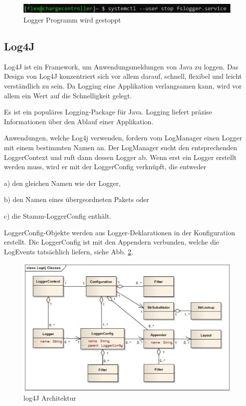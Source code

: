 \begin{figure}[h t]
    \centering
    \includegraphics[scale=0.75]{pics/loggerEnd2.JPG}
    \caption{Logger Programm wird gestoppt}
    \label{fig:impl:loggerEnd}
\end{figure}

\subsection{Log4J}
Log4J ist ein Framework, um Anwendungsmeldungen von Java zu loggen.
Das Design von Log4J konzentriert sich vor allem darauf, schnell, flexibel und leicht verständlich zu sein. Da Logging eine Applikation verlangsamen kann, wird vor allem ein Wert auf die Schnelligkeit gelegt. \cite{log4JBuch} 

Es ist ein populäres Logging-Package für Java. Logging liefert präzise Informationen über den Ablauf einer Applikation. \cite{log4J}


Anwendungen, welche Log4j verwenden, fordern vom LogManager einen Logger mit einem bestimmten Namen an. Der LogManager sucht den entsprechenden LoggerContext und ruft dann dessen Logger ab. 
Wenn erst ein Logger erstellt werden muss, wird er mit der LoggerConfig verknüpft, die entweder 

\begin{compactitem}
    \item[a)] den gleichen Namen wie der Logger, 
    \item[b)] den Namen eines übergeordneten Pakets oder 
    \item[c)] die Stamm-LoggerConfig enthält.
\end{compactitem}

LoggerConfig-Objekte werden aus Logger-Deklarationen in der Konfiguration erstellt. Die LoggerConfig ist mit den Appendern verbunden, welche die LogEvents tatsächlich liefern, siehe Abb. \ref{fig:impl:log4jArchitektur}. \cite{log4J}

\begin{figure}[h t]
    \centering
    \includegraphics[scale=0.7]{pics/log4jArchitektur.jpg}
    \caption{log4J Architektur \cite{log4J}}
    \label{fig:impl:log4jArchitektur}
\end{figure}